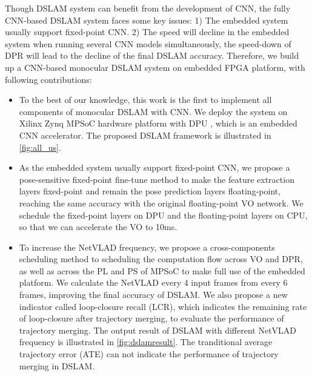 Though DSLAM system can benefit from the development of CNN, the fully CNN-based DSLAM system faces some key issues: 1) The embedded system usually support fixed-point CNN. 2) The speed will decline in the embedded system when running several CNN models simultaneously, the speed-down of DPR will lead to the decline of the final DSLAM accuracy. Therefore, we build up a CNN-based monocular DSLAM system on embedded FPGA platform, with following contributions:

\begin{itemize}
\item To the best of our knowledge, this work is the first to implement all components of monocular DSLAM with CNN.
We deploy the system on Xilinx Zynq MPSoC hardware platform with DPU \cite{Tech:2019360}, which is an embedded CNN accelerator. The proposed DSLAM framework is illustrated in \cref{fig:all_us}.
\item As the embedded system usually support fixed-point CNN, we propose a pose-sensitive fixed-point fine-tune method to make the feature extraction layers fixed-point and remain the pose prediction layers floating-point, reaching the same accuracy with the original floating-point VO network. We schedule the fixed-point layers on DPU and the floating-point layers on CPU, so that we can accelerate the VO to 10ms.
\item To increase the NetVLAD frequency, we propose a cross-components scheduling method to scheduling the computation flow across VO and DPR, as well as across the PL and PS of MPSoC to make full use of the embedded platform. We calculate the NetVLAD every 4 input frames from every 6 frames, improving the final accuracy of DSLAM. 
We also propose a new indicator called loop-closure recall (LCR), which indicates the remaining rate of loop-closure after trajectory merging, to evaluate the performance of trajectory merging. The output result of DSLAM with different NetVLAD frequency is illustrated in \cref{fig:dslamresult}. The tranditional average trajectory error (ATE) can not indicate the performance of trajectory merging in DSLAM.
\end{itemize}



